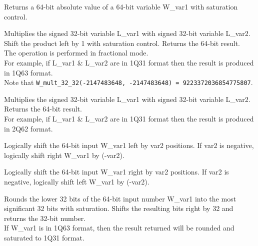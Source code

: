 
Returns a 64-bit absolute value of a 64-bit variable W\_var1 with saturation control.


Multiplies the signed 32-bit variable L\_var1 with signed 32-bit variable L\_var2.
Shift the product left by 1 with saturation control.
Returns the 64-bit result.\\
The operation is performed in fractional mode.\\
For example, if L\_var1 \& L\_var2 are in 1Q31 format then the result is produced in 1Q63 format.\\
Note that {\tt W\_mult\_32\_32(-2147483648, -2147483648) = 9223372036854775807}.


Multiplies the signed 32-bit variable L\_var1 with signed 32-bit variable L\_var2.
Returns the 64-bit result.\\
For example, if L\_var1 \& L\_var2 are in 1Q31 format then the result is produced in 2Q62 format.


Logically shift the 64-bit input W\_var1 left by var2 positions.
If var2 is negative, logically shift right W\_var1 by (-var2).


Logically shift the 64-bit input W\_var1 right by var2 positions.
If var2 is negative, logically shift left W\_var1 by (-var2).


Rounds the lower 32 bits of the 64-bit input number W\_var1 into the most significant 32 bits with saturation.
Shifts the resulting bits right by 32 and returns the 32-bit number.\\
If W\_var1 is in 1Q63 format, then the result returned will be rounded and saturated to 1Q31 format.



